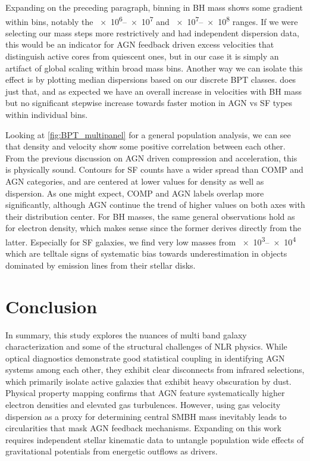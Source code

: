 	Expanding on the preceding paragraph, binning in BH mass shows some gradient within bins, notably the \qtyrange{e6}{e7}{\solarmass}
	and \qtyrange{e7}{e8}{\solarmass} ranges. If we were selecting our mass steps more restrictively and had independent dispersion
	data, this would be an indicator for AGN feedback driven excess velocities that distinguish active cores from quiescent ones, but
	in our case it is simply an artifact of global scaling within broad mass bins. Another way we can isolate this effect is by plotting
	median dispersions based on our discrete BPT classes.  does just that, and as expected we have an overall increase
	in velocities with BH mass but no significant stepwise increase towards faster motion in AGN vs SF types within individual bins.

	Looking at \cref{fig:BPT_multipanel} for a general population analysis, we can see that density and velocity show some positive
	correlation between each other. From the previous discussion on AGN driven compression and acceleration, this is physically sound.
	Contours for SF counts have a wider spread than COMP and AGN categories, and are centered at lower values for density as well as
	dispersion. As one might expect, COMP and AGN labels overlap more significantly, although AGN continue the trend of higher values on
	both axes with their distribution center. For BH masses, the same general observations hold as for electron density, which makes sense since
	the former derives directly from the latter. Especially for SF galaxies, we find very low masses from \qtyrange{e3}{e4}{\solarmass}
	which are telltale signs of systematic bias towards underestimation in objects dominated by emission lines from their stellar disks.

	\section{Conclusion}

	In summary, this study explores the nuances of multi band galaxy characterization and some of the structural challenges of NLR physics.
	While optical diagnostics demonstrate good statistical coupling in identifying AGN systems among each other, they exhibit clear disconnects
	from infrared selections, which primarily isolate active galaxies that exhibit heavy obscuration by dust. Physical property mapping confirms
	that AGN feature systematically higher electron densities and elevated gas turbulences. However, using gas velocity dispersion as a proxy for
	determining central SMBH mass inevitably leads to circularities that mask AGN feedback mechanisms. Expanding on this work requires independent
	stellar kinematic data to untangle population wide effects of gravitational potentials from energetic outflows as drivers.


